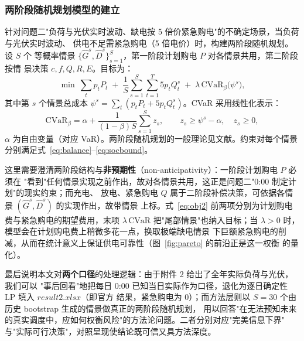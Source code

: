 \documentclass[withoutpreface]{cumcmthesis}
\begin{document}
\subsubsection{两阶段随机规划模型的建立}
针对问题二"负荷与光伏实时波动、缺电按 5 倍价紧急购电"的不确定场景，当负荷与光伏实时波动、
供电不足需紧急购电（5 倍电价）时，构建两阶段随机规划。设 $S$ 个
等概率情景 $\{\hat G^s,\hat D^s\}_{s=1}^S$，第一阶段计划购电 $P$ 对各情景共用，第二阶段按情
景决策 $c,f,Q,R,E$。目标为：
\begin{equation}
    \min \ \sum_t p_t P_t \;+\; \frac1S \sum_{s=1}^S\sum_{t=1}^T 5 p_t Q_t^s
        \;+\; \lambda\, \mathrm{CVaR}_\beta\bigl(\psi^s\bigr),
    \label{eq:obj2}
\end{equation}
其中第 $s$ 个情景总成本 $\psi^s=\sum_t(p_tP_t + 5p_t Q_t^s)$。CVaR 采用线性化表示\cite{rp:cvar,cn:cvar}：
\begin{equation}
    \mathrm{CVaR}_\beta = \alpha + \frac{1}{(1-\beta)S}\sum_{s=1}^S z_s,\qquad
    z_s\ge \psi^s-\alpha,\quad z_s\ge0,
    \label{eq:cvar}
\end{equation}
$\alpha$ 为自由变量（对应 VaR）。两阶段随机规划的一般理论见文献\cite{rp:stoch}。约束对每个情景
分别满足式~\eqref{eq:balance}--\eqref{eq:socbound}。

这里需要澄清两阶段结构与\textbf{非预期性}（non-anticipativity）：一阶段计划购电 $P$ 必须在
"看到"任何情景实现之前作出，故对各情景共用，这正是问题二"0:00 制定计划"的现实约束；而充电、
放电、紧急购电 $Q$ 属于二阶段补偿决策，可依据各情景 $(\hat G^s,\hat D^s)$ 的实现作出，故带情景
上标。式~\eqref{eq:obj2} 前两项分别为计划购电费与紧急购电的期望费用，末项 $\lambda\,\mathrm{CVaR}$
把"尾部情景"也纳入目标；当 $\lambda>0$ 时，模型会在计划购电费上稍微多花一点，换取极端缺电情景
下巨额紧急购电的削减，从而在统计意义上保证供电可靠性（图~\ref{fig:pareto} 的前沿正是这一权衡
的量化）。

最后说明本文对\textbf{两个口径}的处理逻辑：由于附件 2 给出了全年实际负荷与光伏，我们可以
"事后回看"地把每日 0:00 已知当日实际作为口径，退化为逐日确定性 LP 填入 $result2.xlsx$（即官方
结果，紧急购电为 0）；而方法层则以 $S=30$ 个由历史 bootstrap 生成的情景做真正的两阶段随机规划，
用以回答"在无法预知未来的真实调度中，应如何权衡风险"的方法论问题。二者分别对应"完美信息下界"
与"实际可行决策"，对照呈现使结论既可信又具方法深度。
\end{document}
